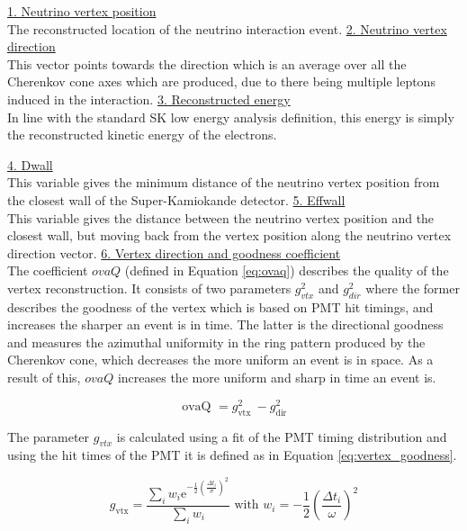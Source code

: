\noindent
\underline{1. Neutrino vertex position}\\
\noindent 
The reconstructed location of the neutrino interaction event.
\newline
\noindent
\underline{2. Neutrino vertex direction}\\
\noindent
This vector points towards the direction which is an average over all the Cherenkov cone axes which are produced, due to there being multiple leptons induced in the interaction.
\newline
\noindent
\underline{3. Reconstructed energy}\\
\noindent 
In line with the standard SK low energy analysis definition, this energy is simply the reconstructed kinetic energy of the electrons. 

\noindent
\underline{4. Dwall}\\
\noindent 
This variable gives the minimum distance of the neutrino vertex position from the closest wall of the Super-Kamiokande detector.
\newline
\noindent
\underline{5. Effwall}\\
\noindent 
This variable gives the distance between the neutrino vertex position and the closest wall, but moving back from the vertex position along the neutrino vertex direction vector.\hfill \break
\newline
\noindent
\underline{6. Vertex direction and goodness coefficient}\\
\noindent 
The coefficient $ovaQ$ (defined in Equation \ref{eq:ovaq}) describes the quality of the vertex reconstruction. It consists of two parameters $g^2_{vtx}$ and $g^2_{dir}$ where the former describes the goodness of the vertex which is based on PMT hit timings, and increases the sharper an event is in time. The latter is the directional goodness and measures the azimuthal uniformity in the ring pattern produced by the Cherenkov cone, which decreases the more uniform an event is in space. As a result of this, $ovaQ$ increases the more uniform and sharp in time an event is.

\begin{equation}
    \text { ovaQ } =g_{\text {vtx }}^{2}-g_{\text {dir }}^{2}
    \label{eq:ovaq}
\end{equation}

The parameter $g_{vtx}$ is calculated using a fit of the PMT timing distribution and using the hit times of the PMT it is defined as in Equation \ref{eq:vertex_goodness}.

\begin{equation}
g_{\mathrm{vtx}}=\frac{\sum_{i} w_{i} \mathrm{e}^{-\frac{1}{2}(\frac{\Delta t_{i}}{\sigma})^{2}}}{\sum_{i} w_{i}} \text { with } w_{i}=-\frac{1}{2}(\frac{\Delta t_{i}}{\omega})^{2}
\label{eq:vertex_goodness}
\end{equation}

